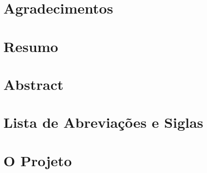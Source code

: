 \documentclass[12pt,a4paper]{report}
\begin{document}



  
  
  
  
  
  
  \chapter*{Agradecimentos}
  
  
  \chapter*{Resumo}
  
  \chapter*{Abstract}
  

  \chapter*{Lista de Abreviações e Siglas}
  


  \listoffigures
  \listoftables
  \tableofcontents

  
  \chapter*{O Projeto}
  
  
\end{document}
